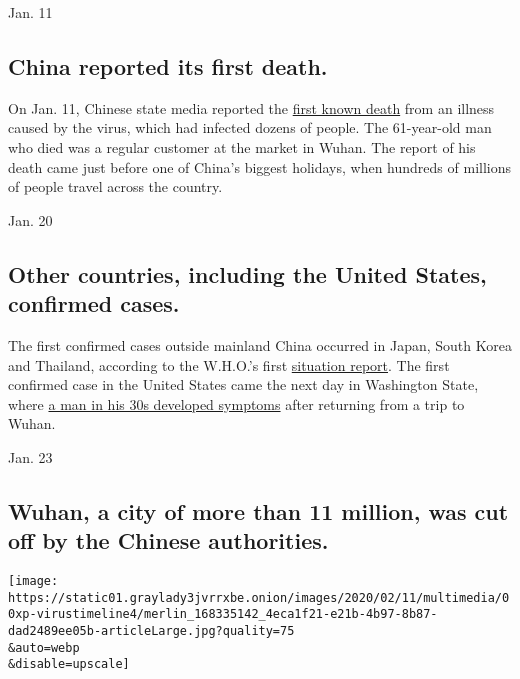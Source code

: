 Jan. 11

\hypertarget{china-reported-its-first-death}{%
\subsection{China reported its first
death.}\label{china-reported-its-first-death}}

On Jan. 11, Chinese state media reported the
\href{https://www.nytimes3xbfgragh.onion/2020/01/10/world/asia/china-virus-wuhan-death.html}{first
known death} from an illness caused by the virus, which had infected
dozens of people. The 61-year-old man who died was a regular customer at
the market in Wuhan. The report of his death came just before one of
China's biggest holidays, when hundreds of millions of people travel
across the country.

Jan. 20

\hypertarget{other-countries-including-the-united-states-confirmed-cases}{%
\subsection{Other countries, including the United States, confirmed
cases.}\label{other-countries-including-the-united-states-confirmed-cases}}

The first confirmed cases outside mainland China occurred in Japan,
South Korea and Thailand, according to the W.H.O.'s first
\href{https://www.who.int/docs/default-source/coronaviruse/situation-reports/20200121-sitrep-1-2019-ncov.pdf?sfvrsn=20a99c10_4}{situation
report}. The first confirmed case in the United States came the next day
in Washington State, where
\href{https://www.nytimes3xbfgragh.onion/2020/01/21/health/cdc-coronavirus.html}{a
man in his 30s developed symptoms} after returning from a trip to Wuhan.

Jan. 23

\hypertarget{wuhan-a-city-of-more-than-11-million-was-cut-off-by-the-chinese-authorities}{%
\subsection{Wuhan, a city of more than 11 million, was cut off by the
Chinese
authorities.}\label{wuhan-a-city-of-more-than-11-million-was-cut-off-by-the-chinese-authorities}}

\texttt{[image: https://static01.graylady3jvrrxbe.onion/images/2020/02/11/multimedia/00xp-virustimeline4/merlin\_168335142\_4eca1f21-e21b-4b97-8b87-dad2489ee05b-articleLarge.jpg?quality=75\\\&auto=webp\\\&disable=upscale]}

